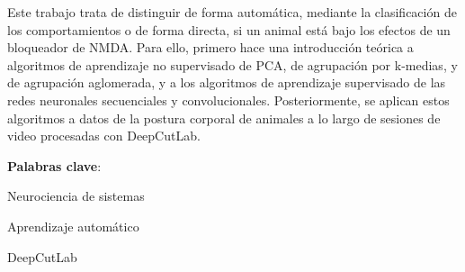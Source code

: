 Este trabajo trata de distinguir de forma automática, mediante la clasificación de los comportamientos o de forma directa, si un animal está bajo los efectos de un bloqueador de NMDA. Para ello, primero hace una introducción teórica a algoritmos de aprendizaje no supervisado de PCA, de agrupación por k-medias, y de agrupación aglomerada, y a los algoritmos de aprendizaje supervisado de las redes neuronales secuenciales y convolucionales. Posteriormente, se aplican estos algoritmos a datos de la postura corporal de animales a lo largo de sesiones de video procesadas con DeepCutLab.

\mbox{} \bigskip

\noindent \textbf{Palabras clave}:
\begin{compactitem}
    \item Neurociencia de sistemas
    \item Aprendizaje automático
    \item DeepCutLab
\end{compactitem}